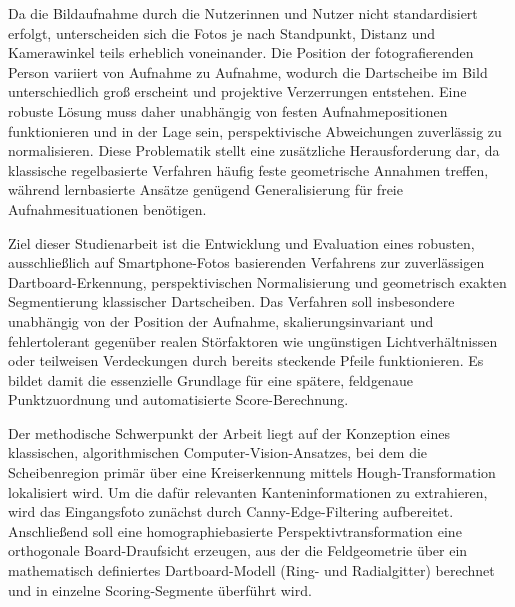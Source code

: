 Da die Bildaufnahme durch die Nutzerinnen und Nutzer nicht standardisiert erfolgt, unterscheiden sich die Fotos je nach Standpunkt, Distanz und Kamerawinkel teils erheblich voneinander. Die Position der fotografierenden Person variiert von Aufnahme zu Aufnahme, wodurch die Dartscheibe im Bild unterschiedlich groß erscheint und projektive Verzerrungen entstehen. Eine robuste Lösung muss daher unabhängig von festen Aufnahmepositionen funktionieren und in der Lage sein, perspektivische Abweichungen zuverlässig zu normalisieren. Diese Problematik stellt eine zusätzliche Herausforderung dar, da klassische regelbasierte Verfahren häufig feste geometrische Annahmen treffen, während lernbasierte Ansätze genügend Generalisierung für freie Aufnahmesituationen benötigen.

Ziel dieser Studienarbeit ist die Entwicklung und Evaluation eines robusten, ausschließlich auf Smartphone-Fotos basierenden Verfahrens zur zuverlässigen Dartboard-Erkennung, perspektivischen Normalisierung und geometrisch exakten Segmentierung klassischer Dartscheiben. Das Verfahren soll insbesondere unabhängig von der Position der Aufnahme, skalierungsinvariant und fehlertolerant gegenüber realen Störfaktoren wie ungünstigen Lichtverhältnissen oder teilweisen Verdeckungen durch bereits steckende Pfeile funktionieren. Es bildet damit die essenzielle Grundlage für eine spätere, feldgenaue Punktzuordnung und automatisierte Score-Berechnung.

Der methodische Schwerpunkt der Arbeit liegt auf der Konzeption eines klassischen, algorithmischen Computer-Vision-Ansatzes, bei dem die Scheibenregion primär über eine Kreiserkennung mittels Hough-Transformation lokalisiert wird. Um die dafür relevanten Kanteninformationen zu extrahieren, wird das Eingangsfoto zunächst durch Canny-Edge-Filtering aufbereitet. Anschließend soll eine homographiebasierte Perspektivtransformation eine orthogonale Board-Draufsicht erzeugen, aus der die Feldgeometrie über ein mathematisch definiertes Dartboard-Modell (Ring- und Radialgitter) berechnet und in einzelne Scoring-Segmente überführt wird.

